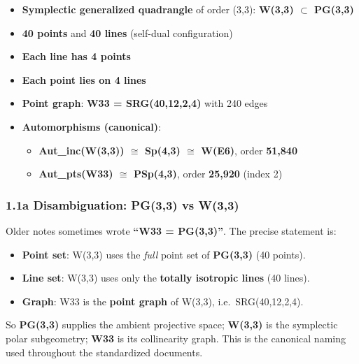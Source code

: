 \documentclass[11pt]{article}
\providecommand{\tightlist}{%
  \setlength{\itemsep}{0pt}\setlength{\parskip}{0pt}}
\begin{document}
\begin{itemize}
\tightlist
\item
  \textbf{Symplectic generalized quadrangle} of order (3,3):
  \textbf{W(3,3) \ensuremath{\subset} PG(3,3)}
\item
  \textbf{40 points} and \textbf{40 lines} (self-dual configuration)
\item
  \textbf{Each line has 4 points}
\item
  \textbf{Each point lies on 4 lines}
\item
  \textbf{Point graph}: \textbf{W33 = SRG(40,12,2,4)} with 240 edges
\item
  \textbf{Automorphisms (canonical)}:

  \begin{itemize}
  \tightlist
  \item
    \textbf{Aut\_inc(W(3,3)) \ensuremath{\cong} Sp(4,3)
    \ensuremath{\cong} W(E6)}, order \textbf{51,840}\\
  \item
    \textbf{Aut\_pts(W33) \ensuremath{\cong} PSp(4,3)}, order
    \textbf{25,920} (index 2)
  \end{itemize}
\end{itemize}

\subsubsection{1.1a Disambiguation: PG(3,3) vs
W(3,3)}\label{a-disambiguation-pg33-vs-w33}

Older notes sometimes wrote \textbf{``W33 = PG(3,3)''}. The precise
statement is:

\begin{itemize}
\tightlist
\item
  \textbf{Point set}: W(3,3) uses the \emph{full} point set of
  \textbf{PG(3,3)} (40 points).\\
\item
  \textbf{Line set}: W(3,3) uses only the \textbf{totally isotropic
  lines} (40 lines).\\
\item
  \textbf{Graph}: W33 is the \textbf{point graph} of W(3,3),
  i.e.~SRG(40,12,2,4).
\end{itemize}

So \textbf{PG(3,3)} supplies the ambient projective space;
\textbf{W(3,3)} is the symplectic polar subgeometry; \textbf{W33} is its
collinearity graph. This is the canonical naming used throughout the
standardized documents.
\end{document}
